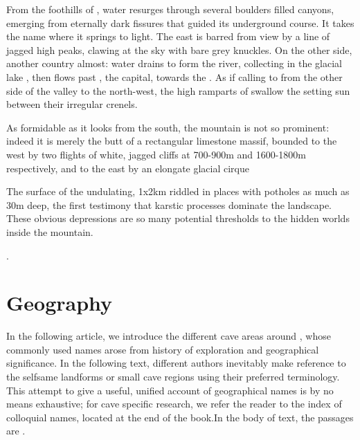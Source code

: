 From the foothills of , water resurges through several boulders filled canyons, emerging from eternally dark fissures that guided its underground course. It takes the name  where it springs to light.  The east is barred from view by a line of jagged high peaks, clawing at the sky with bare grey knuckles. On the other side, another country almost: water drains to form the \passage{} river, collecting in the glacial lake , then flows past , the capital, towards the . As if calling to  from the other side of the  valley to the north-west, the high ramparts of  swallow the setting sun between their irregular crenels.

As formidable as it looks from the south, the mountain is not so prominent: indeed it is merely the butt of a rectangular limestone massif, bounded to the west by two flights of white, jagged cliffs at 700-900m and 1600-1800m respectively, and to the east by an elongate glacial cirque 

The surface of the undulating, 1x2km  riddled in places with potholes as much as 30m deep, the first testimony that karstic processes dominate the landscape. These obvious depressions are so many potential thresholds to the hidden worlds inside the mountain.

. 

\section{Geography}
In the following article, we introduce the different cave areas around , whose commonly used names arose from history of exploration and geographical significance. In the following text, different authors inevitably make reference to the selfsame landforms or small cave regions using their preferred terminology.
This attempt to give a useful, unified account of geographical names is by no means exhaustive; for cave specific research, we refer the reader to the index of colloquial names, located at the end of the book.In the body of text, the passages are .

